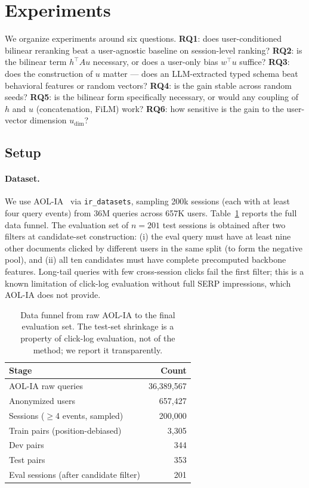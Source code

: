 \section{Experiments}
\label{sec:exp}

We organize experiments around six questions. \textbf{RQ1}: does user-conditioned bilinear reranking beat a user-agnostic baseline on session-level ranking? \textbf{RQ2}: is the bilinear term $h^\top A u$ necessary, or does a user-only bias $w^\top u$ suffice? \textbf{RQ3}: does the construction of $u$ matter --- does an LLM-extracted typed schema beat behavioral features or random vectors? \textbf{RQ4}: is the gain stable across random seeds? \textbf{RQ5}: is the bilinear form specifically necessary, or would any coupling of $h$ and $u$ (concatenation, FiLM) work? \textbf{RQ6}: how sensitive is the gain to the user-vector dimension $u_{\dim}$?

\subsection{Setup}

\paragraph{Dataset.}
We use AOL-IA~\cite{pass2006_picture} via \texttt{ir\_datasets}, sampling 200k sessions (each with at least four query events) from 36M queries across 657K users. Table~\ref{tab:funnel} reports the full data funnel. The evaluation set of $n{=}201$ test sessions is obtained after two filters at candidate-set construction: (i) the eval query must have at least nine other documents clicked by different users in the same split (to form the negative pool), and (ii) all ten candidates must have complete precomputed backbone features. Long-tail queries with few cross-session clicks fail the first filter; this is a known limitation of click-log evaluation without full SERP impressions, which AOL-IA does not provide.

\begin{table}[t]
\centering
\caption{Data funnel from raw AOL-IA to the final evaluation set. The test-set shrinkage is a property of click-log evaluation, not of the method; we report it transparently.}
\label{tab:funnel}
\begin{tabular}{lr}
\toprule
Stage & Count \\
\midrule
AOL-IA raw queries & 36{,}389{,}567 \\
Anonymized users & 657{,}427 \\
Sessions ($\geq$4 events, sampled) & 200{,}000 \\
Train pairs (position-debiased) & 3{,}305 \\
Dev pairs & 344 \\
Test pairs & 353 \\
Eval sessions (after candidate filter) & 201 \\
\bottomrule
\end{tabular}
\end{table}

